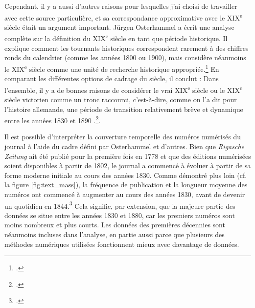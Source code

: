 \documentclass[a4paper,twoside,12pt]{article}
\begin{document}
Cependant, il y a aussi d'autres raisons pour lesquelles j'ai choisi de travailler avec cette source particulière, et sa correspondance approximative avec le XIX\textsuperscript{e} siècle était un argument important. Jürgen Osterhammel a écrit une analyse complète sur la définition du XIX\textsuperscript{e} siècle en tant que période historique. Il explique comment les tournants historiques correspondent rarement à des chiffres ronds du calendrier (comme les années 1800 ou 1900), mais considère néanmoins le XIX\textsuperscript{e} siècle comme une unité de recherche historique appropriée.\footcite[45-67]{osterhammel_transformation_2014} En comparant les différentes options de cadrage du siècle, il conclut : \og Dans l'ensemble, il y a de bonnes raisons de considérer le \og vrai \fg{} XIX\textsuperscript{e} siècle ou le XIX\textsuperscript{e} siècle  \og victorien \fg{} comme un tronc raccourci, c'est-à-dire, comme on l'a dit pour l'histoire allemande, \og une période de transition relativement brève et dynamique entre les années 1830 et 1890 \fg{} \fg{}.\footcite[][62-63]{osterhammel_transformation_2014}.

Il est possible d'interpréter la couverture temporelle des numéros numérisés du journal à l'aide du cadre défini par Osterhammel et d'autres. Bien que \textit{Rigasche Zeitung} ait été publié pour la première fois en 1778 et que des éditions numérisées soient disponibles à partir de 1802, le journal a commencé à évoluer à partir de sa forme moderne initiale au cours des années 1830. Comme démontré plus loin (cf. la figure \ref{fig:text_mass}), la fréquence de publication et la longueur moyenne des numéros ont commencé à augmenter au cours des années 1830, avant de devenir un quotidien en 1844.\footcite[Pour le nombre de numéros par an pendant toute la période de publication du journal, voir][220-222]{annus_eestis_1993} Cela signifie, par extension, que la majeure partie des données se situe entre les années 1830 et 1880, car les premiers numéros sont moins nombreux et plus courts. Les données des premières décennies sont néanmoins incluses dans l'analyse, en partie aussi parce que plusieurs des méthodes numériques utilisées fonctionnent mieux avec davantage de données.
\end{document}
